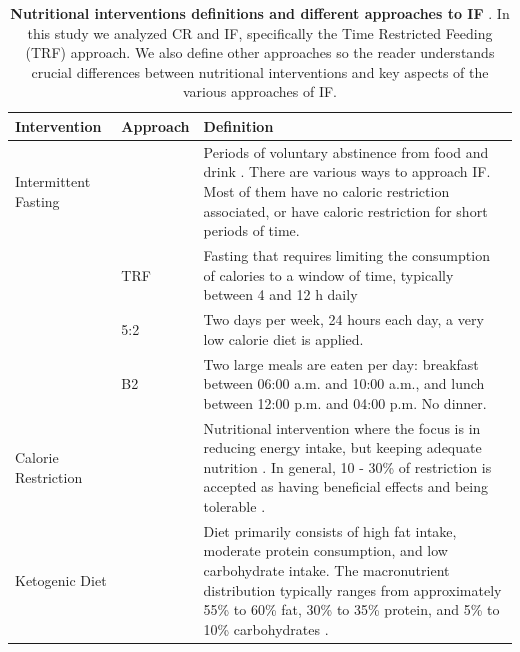 \documentclass[journal,article,submit,pdftex,moreauthors]{Definitions/mdpi}
\begin{document}
{ 
 \begin{table}[H] 
\caption{\textbf{Nutritional interventions definitions and different approaches to IF} \cite{vasim2022intermittent}. In this study we analyzed CR and IF, specifically the Time Restricted Feeding (TRF) approach. We also define other approaches so the reader understands crucial differences between nutritional interventions and key aspects of the various approaches of IF.\label{table1}}
\begin{tabularx}{\textwidth}{CCC}
\toprule
\textbf{Intervention}	& \textbf{Approach}	& \textbf{Definition}\\
\midrule
Intermittent Fasting		&			& Periods of voluntary abstinence from food and drink \cite{vasim2022intermittent}. There are various ways to approach IF. Most of them have no caloric restriction associated, or have caloric restriction for short periods of time.\\
\midrule
	& TRF			& Fasting that requires limiting the consumption of calories to a window of time, typically between 4 and 12 h daily\\
 \midrule
		& 5:2			& Two days per week, 24 hours each day, a very low calorie diet is applied.\\
  \midrule
		& B2			& Two large meals are eaten per day: breakfast between 06:00 a.m. and 10:00 a.m., and lunch between 12:00 p.m. and 04:00 p.m. No dinner.\\
  \midrule
Calorie Restriction	& 			& Nutritional intervention where the focus is in reducing energy intake, but keeping adequate nutrition \cite{most2017calorie}. In general, 10 - 30\% of restriction is accepted as having beneficial effects and being tolerable \cite{flanagan2020calorie, simone2017design}. \\
\midrule
Ketogenic Diet		& 			& Diet primarily consists of high fat intake, moderate protein consumption, and low carbohydrate intake. The macronutrient distribution typically ranges from approximately 55\% to 60\% fat, 30\% to 35\% protein, and 5\% to 10\% carbohydrates \cite{masood2020ketogenic}.\\
\bottomrule
\end{tabularx}
\end{table}


}
\end{document}
